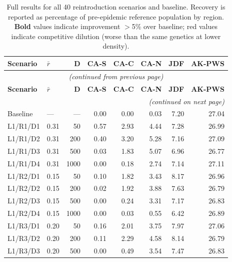 \documentclass[11pt,a4paper]{article}
\newcommand{\rbar}{\ensuremath{\bar{r}}}
\begin{document}
\begin{small}
\begin{longtable}{llrrrrrr}
\caption{Full results for all 40 reintroduction scenarios and baseline. Recovery is reported as percentage of pre-epidemic reference population by region. \textbf{Bold} values indicate improvement $>$5\% over baseline; \textcolor{alertred}{red} values indicate competitive dilution (worse than the same genetics at lower density).}
\label{tab:full_results} \\
\toprule
\textbf{Scenario} & $\rbar$ & \textbf{D} & \textbf{CA-S} & \textbf{CA-C} & \textbf{CA-N} & \textbf{JDF} & \textbf{AK-PWS} \\
\midrule
\endfirsthead
\multicolumn{8}{c}{\small\itshape (continued from previous page)} \\
\toprule
\textbf{Scenario} & $\rbar$ & \textbf{D} & \textbf{CA-S} & \textbf{CA-C} & \textbf{CA-N} & \textbf{JDF} & \textbf{AK-PWS} \\
\midrule
\endhead
\midrule
\multicolumn{8}{r}{\small\itshape (continued on next page)} \\
\endfoot
\bottomrule
\endlastfoot
Baseline & --- & --- & 0.00 & 0.00 & 0.03 & 7.20 & 27.04 \\
\midrule
L1/R1/D1 & 0.31 & 50 & 0.57 & 2.93 & 4.44 & 7.28 & 26.99 \\
L1/R1/D2 & 0.31 & 200 & 0.40 & 3.20 & 5.28 & 7.16 & 27.09 \\
L1/R1/D3 & 0.31 & 500 & \textcolor{alertred}{0.03} & \textcolor{alertred}{1.83} & 5.07 & 6.96 & 26.77 \\
L1/R1/D4 & 0.31 & 1000 & \textcolor{alertred}{0.00} & \textcolor{alertred}{0.18} & \textcolor{alertred}{2.74} & 7.14 & 27.11 \\
\midrule
L1/R2/D1 & 0.15 & 50 & 0.10 & 1.82 & 3.43 & 8.17 & 26.96 \\
L1/R2/D2 & 0.15 & 200 & 0.02 & 1.92 & 3.88 & 7.63 & 26.79 \\
L1/R2/D3 & 0.15 & 500 & \textcolor{alertred}{0.00} & \textcolor{alertred}{0.24} & 3.31 & 7.17 & 26.83 \\
L1/R2/D4 & 0.15 & 1000 & \textcolor{alertred}{0.00} & \textcolor{alertred}{0.03} & \textcolor{alertred}{0.55} & 6.42 & 26.89 \\
\midrule
L1/R3/D1 & 0.20 & 50 & 0.16 & 2.01 & 3.75 & 7.97 & 27.06 \\
L1/R3/D2 & 0.20 & 200 & 0.11 & 2.29 & 4.58 & 8.14 & 26.79 \\
L1/R3/D3 & 0.20 & 500 & \textcolor{alertred}{0.00} & \textcolor{alertred}{0.49} & 3.54 & 7.47 & 26.83 \\

\end{longtable}
\end{small}
\end{document}
